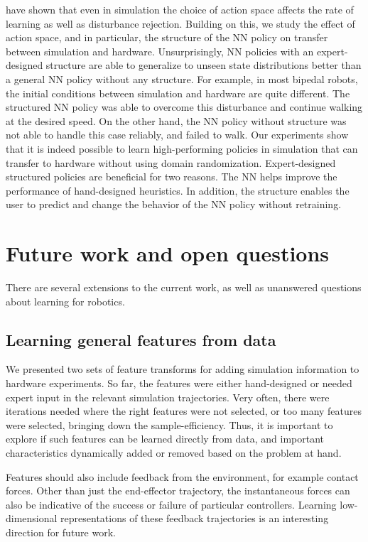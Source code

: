 \cite{peng2017learning} have shown that even in simulation the choice of action space affects the rate of learning as well as disturbance rejection. Building on this, we study the effect of action space, and in particular, the structure of the NN policy on transfer between simulation and hardware. Unsurprisingly, NN policies with an expert-designed structure are able to generalize to unseen state distributions better than a general NN policy without any structure. For example, in most bipedal robots, the initial conditions between simulation and hardware are quite different. The structured NN policy was able to overcome this disturbance and continue walking at the desired speed. On the other hand, the NN policy without structure was not able to handle this case reliably, and failed to walk. Our experiments show that it is indeed possible to learn high-performing policies in simulation that can transfer to hardware without using domain randomization. Expert-designed structured policies are beneficial for two reasons. The NN helps improve the performance of hand-designed heuristics. In addition, the structure enables the user to predict and change the behavior of the NN policy without retraining. 

\section{Future work and open questions}

There are several extensions to the current work, as well as unanswered questions about learning for robotics.

\subsection{Learning general features from data}

We presented two sets of feature transforms for adding simulation information to hardware experiments. So far, the features were either hand-designed or needed expert input in the relevant simulation trajectories. Very often, there were iterations needed where the right features were not selected, or too many features were selected, bringing down the sample-efficiency. Thus, it is important to explore if such features can be learned directly from data, and important characteristics dynamically added or removed based on the problem at hand. 

Features should also include feedback from the environment, for example contact forces. Other than just the end-effector trajectory, the instantaneous forces can also be indicative of the success or failure of particular controllers. Learning low-dimensional representations of these feedback trajectories is an interesting direction for future work. 

